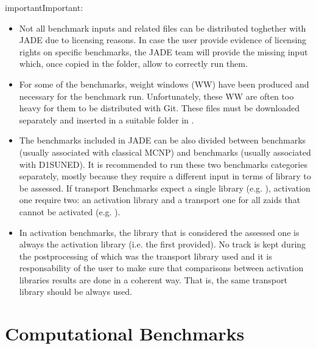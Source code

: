 \documentclass[letterpaper,10pt,english]{sphinxmanual}
\begin{document}
\begin{sphinxadmonition}{important}{Important:}\begin{itemize}
\item {} 
\sphinxAtStartPar
Not all benchmark inputs and related files can be distributed
toghether with JADE due to licensing reasons. In case the user
provide evidence of licensing rights on specific benchmarks, the
JADE team will provide the missing input which, once copied
in the  folder, allow to correctly run them.

\item {} 
\sphinxAtStartPar
For some of the benchmarks, weight windows (WW) have been produced and
necessary for the benchmark run. Unfortunately, these WW are often too
heavy for them to be distributed with Git. These files must be downloaded
separately and inserted in a suitable folder in .

\item {} 
\sphinxAtStartPar
The benchmarks included in JADE can be also divided between
 benchmarks (usually associated with classical
MCNP) and  benchmarks (usually associated with
D1S\sphinxhyphen{}UNED). It is recommended to run these two benchmarks
categories separately, mostly because they require a different
input in terms of library to be assessed. If transport Benchmarks
expect a single library (e.g. ), activation one require
two: an activation library and a transport one for all zaids that
cannot be activated (e.g. ).

\item {} 
\sphinxAtStartPar
In activation benchmarks, the library that is considered the assessed one
is always the activation library (i.e. the first provided). No track
is kept during the post\sphinxhyphen{}processing of which was the transport library used
and it is responsability of the user to make sure that comparisons between
activation libraries results are done in a coherent way. That is, the
same transport library should be always used.

\end{itemize}
\end{sphinxadmonition}


\section{Computational Benchmarks}
\label{\detokenize{usage/benchmarks:computational-benchmarks}}
\end{document}
